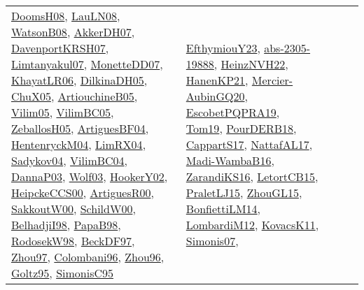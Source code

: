 {\begin{longtable}{lp{3cm}>{\raggedright}p{6cm}>{\raggedright}p{6cm}p{8cm}}
\href{papers/DoomsH08.pdf}{DoomsH08}\cite{DoomsH08}, \href{papers/LauLN08.pdf}{LauLN08}\cite{LauLN08}, \href{papers/WatsonB08.pdf}{WatsonB08}\cite{WatsonB08}, \href{papers/AkkerDH07.pdf}{AkkerDH07}\cite{AkkerDH07}, \href{papers/DavenportKRSH07.pdf}{DavenportKRSH07}\cite{DavenportKRSH07}, \href{papers/Limtanyakul07.pdf}{Limtanyakul07}\cite{Limtanyakul07}, \href{papers/MonetteDD07.pdf}{MonetteDD07}\cite{MonetteDD07}, \href{articles/KhayatLR06.pdf}{KhayatLR06}\cite{KhayatLR06}, \href{papers/DilkinaDH05.pdf}{DilkinaDH05}\cite{DilkinaDH05}, \href{papers/ChuX05.pdf}{ChuX05}\cite{ChuX05}, \href{papers/ArtiouchineB05.pdf}{ArtiouchineB05}\cite{ArtiouchineB05}, \href{papers/Vilim05.pdf}{Vilim05}\cite{Vilim05}, \href{articles/VilimBC05.pdf}{VilimBC05}\cite{VilimBC05}, \href{articles/ZeballosH05.pdf}{ZeballosH05}\cite{ZeballosH05}, \href{papers/ArtiguesBF04.pdf}{ArtiguesBF04}\cite{ArtiguesBF04}, \href{papers/HentenryckM04.pdf}{HentenryckM04}\cite{HentenryckM04}, \href{papers/LimRX04.pdf}{LimRX04}\cite{LimRX04}, \href{papers/Sadykov04.pdf}{Sadykov04}\cite{Sadykov04}, \href{papers/VilimBC04.pdf}{VilimBC04}\cite{VilimBC04}, \href{papers/DannaP03.pdf}{DannaP03}\cite{DannaP03}, \href{papers/Wolf03.pdf}{Wolf03}\cite{Wolf03}, \href{papers/HookerY02.pdf}{HookerY02}\cite{HookerY02}, \href{articles/HeipckeCCS00.pdf}{HeipckeCCS00}\cite{HeipckeCCS00}, \href{articles/ArtiguesR00.pdf}{ArtiguesR00}\cite{ArtiguesR00}, \href{articles/SakkoutW00.pdf}{SakkoutW00}\cite{SakkoutW00}, \href{articles/SchildW00.pdf}{SchildW00}\cite{SchildW00}, \href{articles/BelhadjiI98.pdf}{BelhadjiI98}\cite{BelhadjiI98}, \href{articles/PapaB98.pdf}{PapaB98}\cite{PapaB98}, \href{papers/RodosekW98.pdf}{RodosekW98}\cite{RodosekW98}, \href{papers/BeckDF97.pdf}{BeckDF97}\cite{BeckDF97}, \href{articles/Zhou97.pdf}{Zhou97}\cite{Zhou97}, \href{papers/Colombani96.pdf}{Colombani96}\cite{Colombani96}, \href{papers/Zhou96.pdf}{Zhou96}\cite{Zhou96}, \href{papers/Goltz95.pdf}{Goltz95}\cite{Goltz95}, \href{papers/SimonisC95.pdf}{SimonisC95}\cite{SimonisC95} & \href{papers/EfthymiouY23.pdf}{EfthymiouY23}\cite{EfthymiouY23}, \href{articles/abs-2305-19888.pdf}{abs-2305-19888}\cite{abs-2305-19888}, \href{articles/HeinzNVH22.pdf}{HeinzNVH22}\cite{HeinzNVH22}, \href{papers/HanenKP21.pdf}{HanenKP21}\cite{HanenKP21}, \href{papers/Mercier-AubinGQ20.pdf}{Mercier-AubinGQ20}\cite{Mercier-AubinGQ20}, \href{articles/EscobetPQPRA19.pdf}{EscobetPQPRA19}\cite{EscobetPQPRA19}, \href{papers/Tom19.pdf}{Tom19}\cite{Tom19}, \href{articles/PourDERB18.pdf}{PourDERB18}\cite{PourDERB18}, \href{papers/CappartS17.pdf}{CappartS17}\cite{CappartS17}, \href{articles/NattafAL17.pdf}{NattafAL17}\cite{NattafAL17}, \href{papers/Madi-WambaB16.pdf}{Madi-WambaB16}\cite{Madi-WambaB16}, \href{articles/ZarandiKS16.pdf}{ZarandiKS16}\cite{ZarandiKS16}, \href{articles/LetortCB15.pdf}{LetortCB15}\cite{LetortCB15}, \href{papers/PraletLJ15.pdf}{PraletLJ15}\cite{PraletLJ15}, \href{papers/ZhouGL15.pdf}{ZhouGL15}\cite{ZhouGL15}, \href{papers/BonfiettiLM14.pdf}{BonfiettiLM14}\cite{BonfiettiLM14}, \href{articles/LombardiM12.pdf}{LombardiM12}\cite{LombardiM12}, \href{articles/KovacsK11.pdf}{KovacsK11}\cite{KovacsK11}, \href{articles/Simonis07.pdf}{Simonis07}\cite{Simonis07}, 
\end{longtable}}
